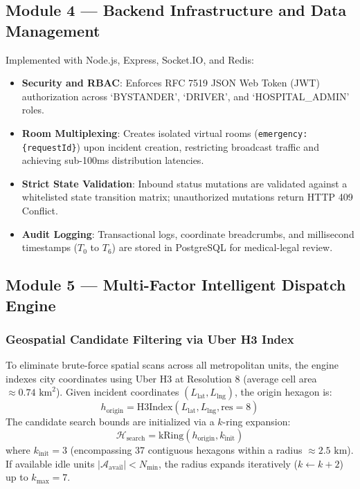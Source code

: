 \documentclass[conference]{IEEEtran}
\begin{document}
\subsection{Module 4 — Backend Infrastructure and Data Management}
Implemented with Node.js, Express, Socket.IO, and Redis:
\begin{itemize}
    \item \textbf{Security and RBAC}: Enforces RFC 7519 JSON Web Token (JWT) authorization across `BYSTANDER', `DRIVER', and `HOSPITAL\_ADMIN' roles.
    \item \textbf{Room Multiplexing}: Creates isolated virtual rooms (\texttt{emergency:\{requestId\}}) upon incident creation, restricting broadcast traffic and achieving sub-100ms distribution latencies.
    \item \textbf{Strict State Validation}: Inbound status mutations are validated against a whitelisted state transition matrix; unauthorized mutations return HTTP 409 Conflict.
    \item \textbf{Audit Logging}: Transactional logs, coordinate breadcrumbs, and millisecond timestamps ($T_0$ to $T_6$) are stored in PostgreSQL for medical-legal review.
\end{itemize}

\subsection{Module 5 — Multi-Factor Intelligent Dispatch Engine}
\subsubsection{Geospatial Candidate Filtering via Uber H3 Index}
To eliminate brute-force spatial scans across all metropolitan units, the engine indexes city coordinates using Uber H3 at Resolution 8 (average cell area $\approx 0.74\text{ km}^2$). Given incident coordinates $(L_{\text{lat}}, L_{\text{lng}})$, the origin hexagon is:
\begin{equation}
h_{\text{origin}} = \text{H3Index}(L_{\text{lat}}, L_{\text{lng}}, \text{res}=8)
\end{equation}
The candidate search bounds are initialized via a $k$-ring expansion:
\begin{equation}
\mathcal{H}_{\text{search}} = \text{kRing}(h_{\text{origin}}, k_{\text{init}})
\end{equation}
where $k_{\text{init}} = 3$ (encompassing 37 contiguous hexagons within a radius $\approx 2.5\text{ km}$). If available idle units $|\mathcal{A}_{\text{avail}}| < N_{\text{min}}$, the radius expands iteratively ($k \leftarrow k + 2$) up to $k_{\text{max}} = 7$.
\end{document}
